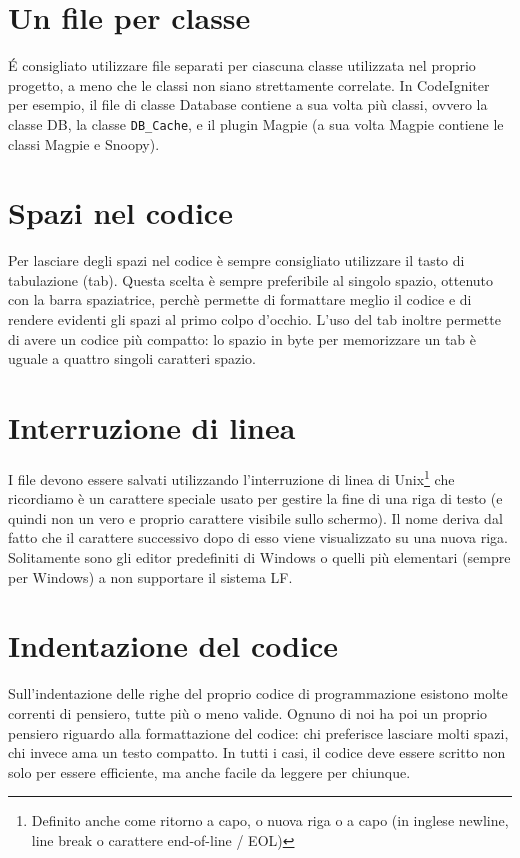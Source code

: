 \section*{Un file per classe}
\'E consigliato utilizzare file separati per ciascuna classe utilizzata nel proprio progetto, a meno che le classi non siano strettamente correlate. In CodeIgniter per esempio, il file di classe Database contiene a sua volta più classi, ovvero la classe DB, la classe \verb|DB_Cache|, e il plugin Magpie (a sua volta Magpie contiene le classi Magpie e Snoopy).

\section*{Spazi nel codice}
Per lasciare degli spazi nel codice è sempre consigliato utilizzare il tasto di tabulazione (tab). Questa scelta è sempre preferibile al singolo spazio, ottenuto con la barra spaziatrice, perchè permette di formattare meglio il codice e di rendere evidenti gli spazi al primo colpo d'occhio. L'uso del tab inoltre permette di avere un codice più compatto: lo spazio in byte per memorizzare un tab è uguale a quattro singoli caratteri spazio.

\section*{Interruzione di linea}
I file devono essere salvati utilizzando l'interruzione di linea di Unix\footnote{Definito anche come ritorno a capo, o nuova riga o a capo (in inglese newline, line break o carattere end-of-line / EOL)} che ricordiamo  è un carattere speciale usato per gestire la fine di una riga di testo (e quindi non un vero e proprio carattere visibile sullo schermo). Il nome deriva dal fatto che il carattere successivo dopo di esso viene visualizzato su una nuova riga. Solitamente sono gli editor predefiniti di Windows o quelli più elementari (sempre per Windows) a non supportare il sistema LF.

\section*{Indentazione del codice}
Sull'indentazione delle righe del proprio codice di programmazione esistono molte correnti di pensiero, tutte più o meno valide. Ognuno di noi ha poi un proprio pensiero riguardo alla formattazione del codice: chi preferisce lasciare molti spazi, chi invece ama un testo compatto. In tutti i casi, il codice deve essere scritto non solo per essere efficiente, ma anche facile da leggere per chiunque.


